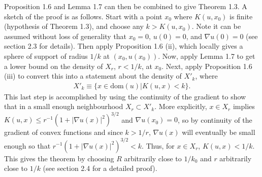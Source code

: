 \documentclass[10pt]{article}
\begin{document}
Proposition 1.6 and Lemma 1.7 can then be combined to give Theorem 1.3. A sketch of the proof is as follows. Start with a point $x_0$ where $K(u,x_0)$ is finite (hypothesis of Theorem 1.3), and choose any $k>K(u,x_0)$. Note it can be assumed without loss of generality that $x_0=0$, $u(0)=0$, and $\nabla u(0)=0$ (see section 2.3 for details). Then apply Proposition 1.6 (ii), which locally gives a sphere of support of radius $1/k$ at $(x_0,u(x_0))$. Now, apply Lemma 1.7 to get a lower bound on the density of $X_r$, $r<1/k$, at $x_0$. Next, apply Proposition 1.6 (iii) to convert this into a statement about the density of $X'_k$, where
\begin{align*}
X'_k \equiv \{ x\in \text{dom}(u) | K(u,x)<k \}.
\end{align*}
This last step is accomplished by using the continuity of the gradient to show that in a small enough neighbourhood $ X_r \subset X'_k $. More explicitly, $x\in X_r$ implies $K(u,x)\leq r^{-1}(1+|\nabla u(x)|^2)^{3/2}$ and $\nabla u(x_0)=0$, so by continuity of the gradient of convex functions and since $k>1/r$, $\nabla u(x)$ will eventually be small enough so that $r^{-1}(1+|\nabla u(x)|^2)^{3/2}<k$. Thus, for $x\in X_r$, $K(u,x)<1/k$. This gives the theorem by choosing $R$ arbitrarily close to $1/k_0$ and $r$ arbitrarily close to $1/k$ (see section 2.4 for a detailed proof).
\end{document}
